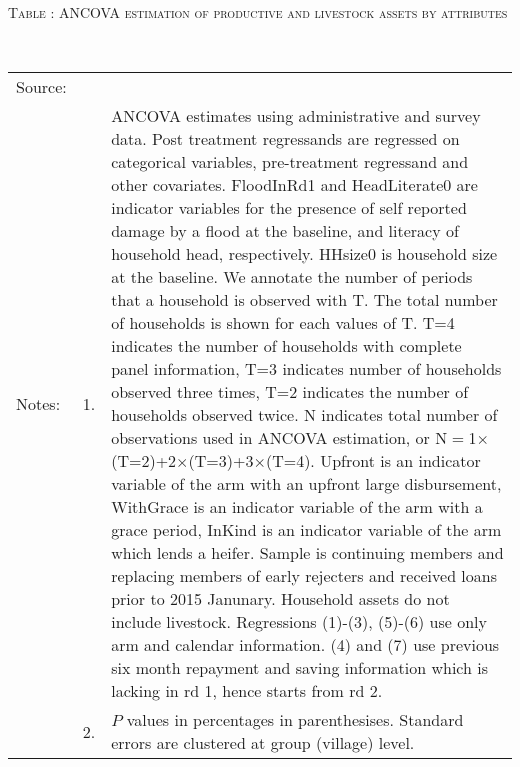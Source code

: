 \hspace{-1cm}\begin{minipage}[t]{14cm}
\hfil\textsc{\normalsize Table \thetable: ANCOVA estimation of productive and livestock assets by attributes\label{tab ANCOVA productive and livestock assets attributes}}\\
\setlength{\tabcolsep}{1pt}
\setlength{\baselineskip}{8pt}
\renewcommand{\arraystretch}{.55}
\hfil{}\\
\renewcommand{\arraystretch}{.8}
\setlength{\tabcolsep}{1pt}
\begin{tabular}{>{\hfill\scriptsize}p{1cm}<{}>{\hfill\scriptsize}p{.25cm}<{}>{\scriptsize}p{12cm}<{\hfill}}
Source:& \multicolumn{2}{l}{\scriptsize Estimated with GUK administrative and survey data.}\\
Notes: & 1. & ANCOVA estimates using administrative and survey data. Post treatment regressands are regressed on categorical variables, pre-treatment regressand and other covariates. \textsf{FloodInRd1} and \textsf{HeadLiterate0} are indicator variables for the presence of self reported damage by a flood at the baseline, and literacy of household head, respectively. \textsf{HHsize0} is household size at the baseline. We annotate the number of periods that a household is observed with \textsf{T}. The total number of households is shown for each values of \textsf{T}. \textsf{T=4} indicates the number of households with complete panel information, \textsf{T=3} indicates number of households observed three times, \textsf{T=2} indicates the number of households observed twice. \textsf{N} indicates total number of observations used in ANCOVA estimation, or \textsf{N$=$1$\times$(T=2)+2$\times$(T=3)+3$\times$(T=4)}.  \textsf{Upfront} is an indicator variable of the arm with an upfront large disbursement, \textsf{WithGrace} is an indicator variable of the arm with a grace period, \textsf{InKind} is an indicator variable of the arm which lends a heifer. Sample is continuing members and replacing members of early rejecters and received loans prior to 2015 Janunary. Household assets do not include livestock. Regressions (1)-(3), (5)-(6) use only arm and calendar information. (4) and (7) use previous six month repayment and saving information which is lacking in rd 1, hence starts from rd 2.\\
& 2. & $P$ values in percentages in parenthesises. Standard errors are clustered at group (village) level.
\end{tabular}
\end{minipage}

